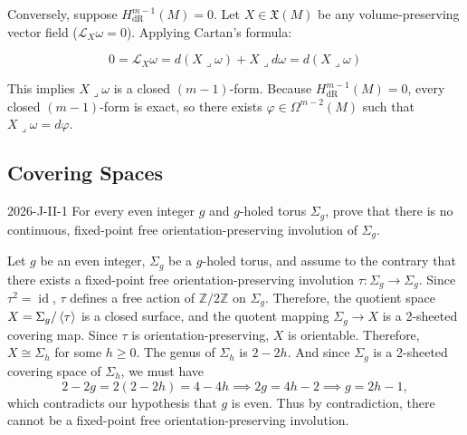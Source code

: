 \documentclass{article}
\begin{document}
	Conversely, suppose $H^{m-1}_{\text{dR}}(M) = 0$. Let $X \in \mathfrak{X}(M)$ be any volume-preserving vector field ($\mathcal{L}_X \omega = 0$). Applying Cartan's formula:
	
	
	$$0 = \mathcal{L}_X \omega = d(X \lrcorner \omega) + X \lrcorner d\omega = d(X \lrcorner \omega)$$
	
	This implies $X \lrcorner \omega$ is a closed $(m-1)$-form. Because $H^{m-1}_{\text{dR}}(M) = 0$, every closed $(m-1)$-form is exact, so there exists $\varphi \in \Omega^{m-2}(M)$ such that $X \lrcorner \omega = d\varphi$.

	
	\subsection{Covering Spaces}
	
	\begin{prb}{2026-J-II-1}
		For every even integer $g$ and $g$-holed torus $\Sigma_g$, prove that there is no continuous, fixed-point free orientation-preserving involution of $\Sigma_g$. 
	\end{prb}
	Let $g$ be an even integer, $\Sigma_g$ be a $g$-holed torus, and assume to the contrary that there exists a fixed-point free orientation-preserving involution $\tau: \Sigma_g \to \Sigma_g$. Since $\tau^2 = \operatorname{id}$, $\tau$ defines a free action of $\mathbb{Z}/2\mathbb{Z}$ on $\Sigma_g$. Therefore, the quotient space $X = \Sigma_g/\braket{\tau}$ is a closed surface, and the quotent mapping $\Sigma_g \to X$ is a 2-sheeted covering map. Since $\tau$ is orientation-preserving, $X$ is orientable. Therefore, $X \cong \Sigma_h$ for some $h \geq 0$. The genus of $\Sigma_h$ is $2 -2h$. And since $\Sigma_g$ is a 2-sheeted covering space of $\Sigma_h$, we must have 
	\begin{equation*}
		2 - 2g = 2(2 - 2h) = 4 - 4h \implies 2g = 4h -2 \implies g = 2h -1, 
	\end{equation*}
	which contradicts our hypothesis that $g$ is even. Thus by contradiction, there cannot be a fixed-point free orientation-preserving involution. 
	
\end{document}
